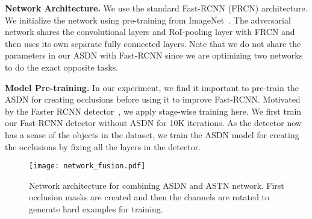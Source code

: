 \documentclass[10pt,twocolumn,letterpaper]{article}
\begin{document}
\textbf{Network Architecture.} We use the standard Fast-RCNN (FRCN) architecture. We initialize the network using pre-training from ImageNet~\cite{imagenet}.  The adversarial network shares the convolutional layers and RoI-pooling layer with FRCN and then uses its own separate fully connected layers. Note that we do not share the parameters in our ASDN with Fast-RCNN since we are optimizing two networks to do the exact opposite tasks. 

\textbf{Model Pre-training.} In our experiment, we find it important to pre-train the ASDN for creating occlusions before using it to improve Fast-RCNN. Motivated by the Faster RCNN detector~\cite{renNIPS15fasterrcnn}, we apply stage-wise training here. We first train our Fast-RCNN detector without ASDN for 10K iterations. As the detector now has a sense of the objects in the dataset, we train the ASDN model for creating the occlusions by fixing all the layers in the detector.

\begin{figure*}[t]
    \centering
    \texttt{[image: network\_fusion.pdf]}
    \caption{Network architecture for combining ASDN and ASTN network. First occlusion masks are created and then the channels are rotated to generate hard examples for training.}\label{fig:network_fusion}
\end{figure*}
\end{document}

